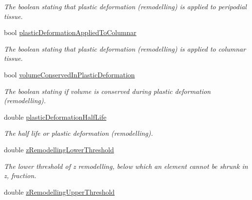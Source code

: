 \begin{DoxyCompactItemize}
\begin{DoxyCompactList}\small\item\em The boolean stating that plastic deformation (remodelling) is applied to peripodial tissue. \end{DoxyCompactList}\item 
\hypertarget{classSimulation_a42218fdf4e2a624fd4886edb39125251}{}bool \hyperlink{classSimulation_a42218fdf4e2a624fd4886edb39125251}{plastic\+Deformation\+Applied\+To\+Columnar}\label{classSimulation_a42218fdf4e2a624fd4886edb39125251}

\begin{DoxyCompactList}\small\item\em The boolean stating that plastic deformation (remodelling) is applied to columnar tissue. \end{DoxyCompactList}\item 
\hypertarget{classSimulation_a0e44e881245a507dc96188a8934b3bcc}{}bool \hyperlink{classSimulation_a0e44e881245a507dc96188a8934b3bcc}{volume\+Conserved\+In\+Plastic\+Deformation}\label{classSimulation_a0e44e881245a507dc96188a8934b3bcc}

\begin{DoxyCompactList}\small\item\em The boolean stating if volume is conserved during plastic deformation (remodelling). \end{DoxyCompactList}\item 
\hypertarget{classSimulation_a1aeea82e56a6523f2918583af1ecdd1a}{}double \hyperlink{classSimulation_a1aeea82e56a6523f2918583af1ecdd1a}{plastic\+Deformation\+Half\+Life}\label{classSimulation_a1aeea82e56a6523f2918583af1ecdd1a}

\begin{DoxyCompactList}\small\item\em The half life or plastic deformation (remodelling). \end{DoxyCompactList}\item 
\hypertarget{classSimulation_a28126585484ed0c7676c880cfe92f991}{}double \hyperlink{classSimulation_a28126585484ed0c7676c880cfe92f991}{z\+Remodelling\+Lower\+Threshold}\label{classSimulation_a28126585484ed0c7676c880cfe92f991}

\begin{DoxyCompactList}\small\item\em The lower threshold of z remodelling, below which an element cannot be shrunk in z, fraction. \end{DoxyCompactList}\item 
\hypertarget{classSimulation_ab455f57038010e1d9c6694eb99ddca8e}{}double \hyperlink{classSimulation_ab455f57038010e1d9c6694eb99ddca8e}{z\+Remodelling\+Upper\+Threshold}\label{classSimulation_ab455f57038010e1d9c6694eb99ddca8e}


\end{DoxyCompactItemize}
